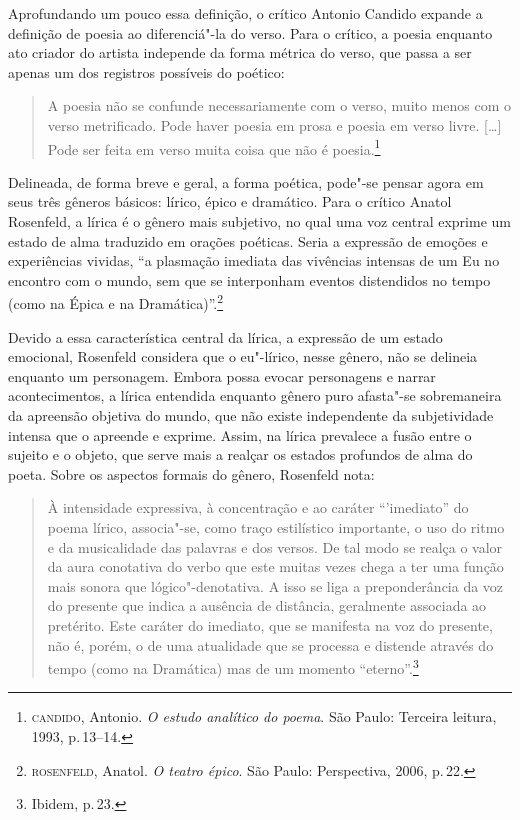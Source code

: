 Aprofundando um pouco essa definição, o crítico Antonio Candido expande a definição de poesia ao diferenciá"-la do verso.
Para o crítico, a poesia enquanto ato criador do artista independe da forma métrica do verso, que passa a ser apenas um dos registros possíveis do poético:

\begin{quote}
A poesia não se confunde necessariamente com o verso, muito menos com o verso metrificado. Pode haver poesia em prosa e poesia em verso livre. [\ldots]
Pode ser feita em verso muita coisa que não é poesia.\footnote{\textsc{candido}, Antonio. \textit{O estudo analítico do poema}. São Paulo: Terceira leitura, 1993, p.\,13--14.}
\end{quote}

Delineada, de forma breve e geral, a forma poética, pode"-se pensar agora em seus três gêneros básicos: lírico, épico e dramático.
Para o crítico Anatol Rosenfeld, a lírica é o gênero mais subjetivo, no qual uma voz central exprime um estado de alma traduzido em orações poéticas.
Seria a expressão de emoções e experiências vividas, ``a plasmação imediata das vivências intensas de um Eu no encontro com o mundo, sem que se interponham eventos distendidos no tempo (como na Épica e na Dramática)''.\footnote{\textsc{rosenfeld}, Anatol. \textit{O teatro épico}. São Paulo: Perspectiva, 2006, p.\,22.}

Devido a essa característica central da lírica, a expressão de um estado emocional, Rosenfeld considera que o eu"-lírico, nesse gênero, não se delineia enquanto um personagem. Embora possa evocar personagens e narrar acontecimentos, a lírica entendida enquanto gênero puro afasta"-se sobremaneira da apreensão objetiva do mundo, que não existe independente da subjetividade intensa que o apreende e exprime. Assim, na lírica prevalece a fusão entre o sujeito e o objeto, que serve mais a realçar os estados profundos de alma do poeta.
Sobre os aspectos formais do gênero, Rosenfeld nota:

\begin{quote}
À intensidade expressiva, à concentração e ao caráter ``'imediato'' do poema lírico, associa"-se, como traço estilístico importante, o uso do ritmo e da musicalidade das palavras e dos versos. De tal modo se realça o valor da aura conotativa do verbo que este muitas vezes chega a ter uma função mais sonora que lógico"-denotativa. A isso se liga a preponderância da voz do presente que indica a ausência de distância, geralmente associada ao pretérito. Este caráter do imediato, que se manifesta na voz do presente, não é, porém, o de uma atualidade que se processa e distende através do tempo (como na Dramática) mas de um momento ``eterno''.\footnote{Ibidem, p.\,23.}
\end{quote}


